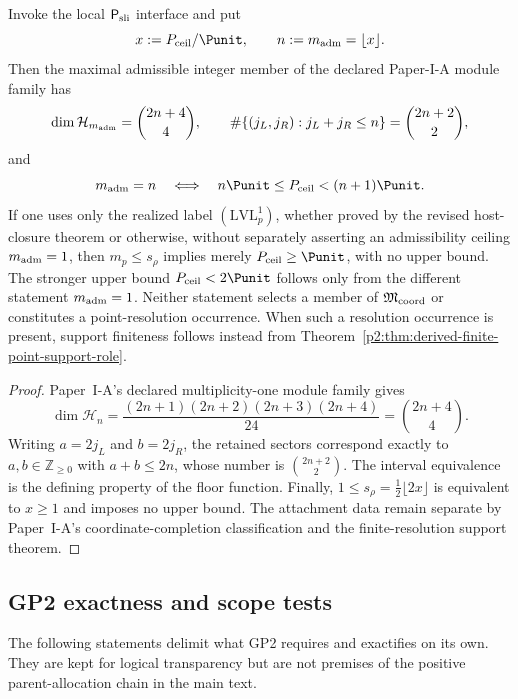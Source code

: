 \documentclass[11pt,a4paper]{article}
\begin{document}
\begin{corollary}
\label{p2:cor:admissible-module-capacity}
Invoke the local \(\mathsf P_{\rm sli}\) interface and put
\[
 x:=P_{\rm ceil}/\Punit,\qquad
 n:=m_{\rm adm}=\lfloor x\rfloor.
\]
Then the maximal admissible integer member of the declared Paper-I-A module
family has
\[
 \dim\mathcal H_{m_{\rm adm}}
 =\binom{2n+4}{4},
 \qquad
 \#\{(j_L,j_R):j_L+j_R\le n\}
 =\binom{2n+2}{2},
\]
and
\[
 m_{\rm adm}=n
 \quad\Longleftrightarrow\quad
 n\Punit\le P_{\rm ceil}<(n+1)\Punit.
\]
If one uses only the realized label \((\mathrm{LVL}_p^1)\), whether proved by
the revised host-closure theorem or otherwise, without separately asserting an
admissibility ceiling \(m_{\rm adm}=1\), then \(m_p\le s_\rho\) implies merely
\(P_{\rm ceil}\ge\Punit\), with no upper bound.  The stronger upper bound
\(P_{\rm ceil}<2\Punit\) follows only from the different statement
\(m_{\rm adm}=1\).  Neither statement selects a member of
\(\mathfrak M_{\rm coord}\) or constitutes a point-resolution occurrence.
When such a resolution occurrence is present, support finiteness follows
instead from Theorem~\ref{p2:thm:derived-finite-point-support-role}.
\end{corollary}

\begin{proof}
Paper~I-A's declared multiplicity-one module family gives
\[
 \dim\mathcal H_n
 =\frac{(2n+1)(2n+2)(2n+3)(2n+4)}{24}
 =\binom{2n+4}{4}.
\]
Writing \(a=2j_L\) and \(b=2j_R\), the retained sectors correspond exactly
to \(a,b\in\mathbb Z_{\ge0}\) with \(a+b\le2n\), whose number is
\(\binom{2n+2}{2}\).  The interval equivalence is the defining property of
the floor function.  Finally, \(1\le s_\rho=\tfrac12\lfloor2x\rfloor\)
is equivalent to \(x\ge1\) and imposes no upper bound.  The attachment data
remain separate by Paper~I-A's coordinate-completion classification and the
finite-resolution support theorem.
\end{proof}



\subsection{GP2 exactness and scope tests}
\label{p2:app:gp2-scope-diagnostics}
The following statements delimit what GP2 requires and exactifies on its own.  They are kept
for logical transparency but are not premises of the positive parent-allocation
chain in the main text.
\end{document}
